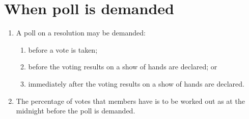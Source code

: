 \section{When poll is demanded}

\begin{enumerate}[label=(\alph*)]
    \item A poll on a resolution may be demanded:
    \begin{enumerate}[label=(\roman*)]
        \item before a vote is taken;
        \item before the voting results on a show of hands are declared; or
        \item immediately after the voting results on a show of hands are declared.
    \end{enumerate}
    
    \item The percentage of votes that members have is to be worked out as at the midnight before the poll is demanded.
\end{enumerate} 